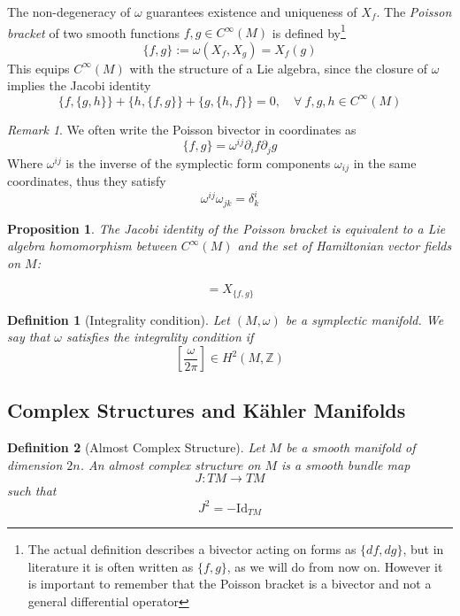 \documentclass[
  12pt,
  a4paper, oneside
]{report}
\theoremstyle{bolddef}
\newtheorem{definition}{Definition}
\newtheorem{proposition}[theorem]{Proposition}
\theoremstyle{remark}
\newtheorem{remark}[theorem]{Remark}
\numberwithin{equation}{chapter}
\begin{document}
The non-degeneracy of $\omega$ guarantees existence and uniqueness of $X_f$.
The \textit{Poisson bracket} of two smooth functions $f,g\in C^\infty(M)$ is defined by\footnote{The actual definition describes a bivector acting on forms as $\{ df,dg\}$, but in literature it is often written as $\{ f,g\}$, as we will do from now on. However it is important to remember that the Poisson bracket is a bivector and not a general differential operator}
$$
\{f,g\}
:=
\omega(X_f,X_g) = X_{f}(g)
$$
This equips $C^\infty(M)$ with the structure of a Lie algebra, since the closure of $\omega$ implies the Jacobi identity
$$
\{ f,\{ g,h\}\} + \{ h,\{ f,g\}\} + \{ g,\{ h,f\}\} = 0, \quad \forall \:f,g,h \in C^\infty(M)
$$
\begin{remark}
We often write the Poisson bivector in coordinates as 
$$
\{ f,g\} = \omega^{ij}\partial_{i}f \partial_{j}g
$$
Where $\omega^{ij}$ is the inverse of the symplectic form components $\omega_{ij}$ in the same coordinates, thus they satisfy
$$
\omega^{ij}\omega_{jk} = \delta^{i}_{k}
$$
\end{remark}
\begin{proposition}
The Jacobi identity of the Poisson bracket is equivalent to a Lie algebra homomorphism between $C^\infty(M)$ and the set of Hamiltonian vector fields on $M$:

\begin{equation}
    [X_{f},X_{g}] = X_{\{ f,g\}} \label{eq:liealghom}
\end{equation}
\vspace{1.5em}
\end{proposition}

\begin{definition}[Integrality condition]
Let $(M,\omega)$ be a symplectic manifold. 
We say that $\omega$ satisfies the \emph{integrality condition} if
$$
\left[\frac{\omega}{2\pi}\right]
\in
H^2(M,\mathbb Z)
$$
\end{definition}
\subsection*{Complex Structures and Kähler Manifolds}

\begin{definition}[Almost Complex Structure]
Let $M$ be a smooth manifold of dimension $2n$.
An \emph{almost complex structure} on $M$ is a smooth bundle map
$$
J : TM \to TM
$$
such that
$$
J^2 = - \mathrm{Id}_{TM}
$$
\end{definition}
\end{document}
